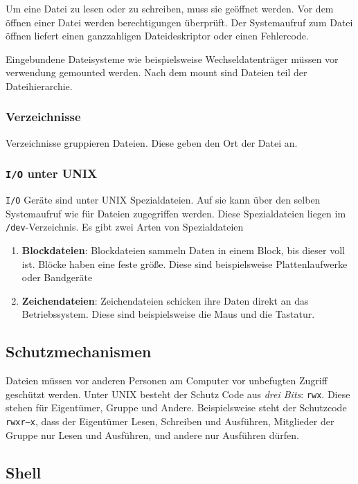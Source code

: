 Um eine Datei zu lesen oder zu schreiben, muss sie geöffnet werden. Vor dem
öffnen einer Datei werden berechtigungen überprüft. Der Systemaufruf zum Datei
öffnen liefert einen ganzzahligen Dateideskriptor oder einen Fehlercode.

Eingebundene Dateisysteme wie beispielsweise Wechseldatenträger müssen vor
verwendung gemounted werden. Nach dem mount sind Dateien teil der
Dateihierarchie.

\subsubsection{Verzeichnisse}

Verzeichnisse gruppieren Dateien. Diese geben den Ort der Datei an.

\subsubsection{\texttt{I/O} unter UNIX}

\texttt{I/O} Geräte sind unter UNIX Spezialdateien. Auf sie kann über den selben Systemaufruf wie für Dateien zugegriffen werden. Diese Spezialdateien liegen im \texttt{/dev}-Verzeichnis. Es gibt zwei Arten von Spezialdateien

\begin{enumerate}
    \item \textbf{Blockdateien}: Blockdateien sammeln Daten in einem Block, bis dieser voll ist. Blöcke haben eine feste größe. Diese sind beispielsweise Plattenlaufwerke oder Bandgeräte
    \item \textbf{Zeichendateien}: Zeichendateien schicken ihre Daten direkt an das Betriebssystem. Diese sind beispielsweise die Maus und die Tastatur.
\end{enumerate}

\subsection{Schutzmechanismen}

Dateien müssen vor anderen Personen am Computer vor unbefugten Zugriff
geschützt werden. Unter UNIX besteht der Schutz Code aus \textit{drei Bits}:
\texttt{rwx}. Diese stehen für Eigentümer, Gruppe und Andere. Beispielsweise
steht der Schutzcode \texttt{rwxr--x}, dass der Eigentümer Lesen, Schreiben und
Ausführen, Mitglieder der Gruppe nur Lesen und Ausführen, und andere nur
Ausführen dürfen.

\subsection{Shell}

